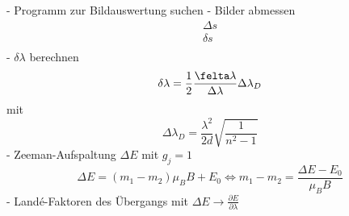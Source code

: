- Programm zur Bildauswertung suchen
- Bilder abmessen
  \begin{align}
    \Delta s\\
    \delta s\\
  \end{align}
- $\delta \lambda$ berechnen
  \begin{equation}
    \delta \lambda = \frac{1}{2} \frac{\felta \lambda}{\Delta \lambda} \Delta \lambda_{D}
  \end{equation}
  mit
  \begin{equation}
    \Delta \lambda_{D}= \frac{\lambda^2}{2 d} \sqrt{\frac{1}{n^2-1}}
  \end{equation}
- Zeeman-Aufspaltung $\Delta E$ mit $g_{j}=1$
  \begin{equation}
    \Delta E = ( m_{1} - m_{2} )\mu_{B} B + E_{0} \Leftrightarrow m_{1}-m_{2}= \frac{\Delta E - E_{0}}{\mu_{B} B}
  \end{equation}
- Landé-Faktoren des Übergangs mit $\Delta E \rightarrow \frac{\partial E}{\partial \lambda}$
